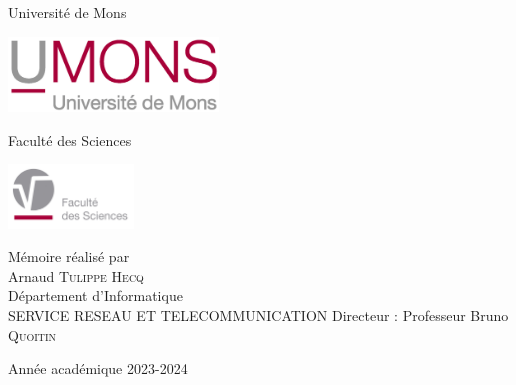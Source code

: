 \documentclass[12pt,a4paper,oneside, titlepage]{report}
\begin{document}
\begin{titlepage}

\begin{center}
\textnormal{\Large{Universit\'e de Mons}}\\[0.3em]

\begin{center}
\includegraphics[height=2cm]{UMONS-logo.jpg}
\end{center}

\textnormal{\Large{Facult\'e des Sciences}}\\[0.3em]

\begin{center}
\includegraphics[height=1.7cm]{FS-logo.jpg}
\end{center}


\end{center}
\vspace*{2cm}
\begin{center}
\end{center}
\vspace*{1.5cm}


 
\large{
\begin{center}
M\'emoire r\'ealis\'e par\\
 Arnaud \textsc{Tulippe Hecq}\\
 \vspace*{1.5cm}
\textnormal{\Large{D\'epartement d'Informatique}}\\[0.3em]
\textnormal{\Large{SERVICE RESEAU ET TELECOMMUNICATION}}
Directeur : Professeur Bruno \textsc{Quoitin}  

\end{center}}

\vfill

\begin{center}
Ann\'ee acad\'emique 2023-2024
\end{center}

\end{titlepage}
\end{document}
